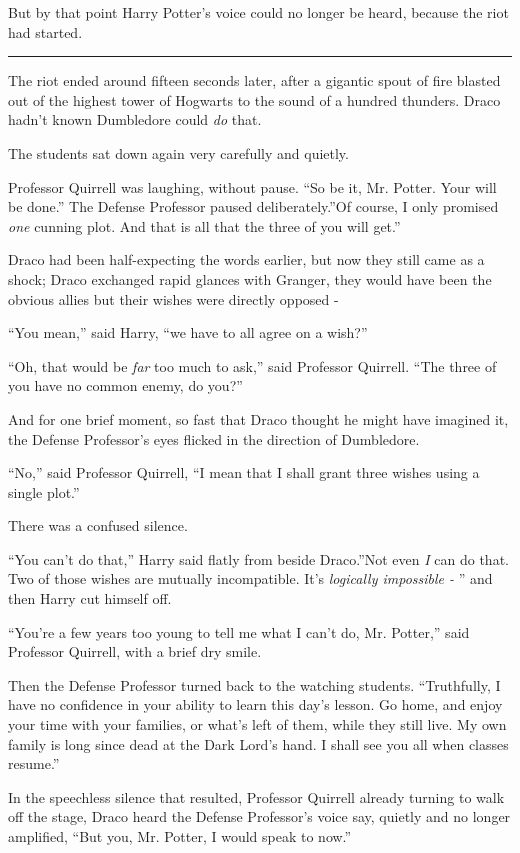 But by that point Harry Potter's voice could no longer be heard, because
the riot had started.

\begin{center}\rule{3in}{0.4pt}\end{center}

The riot ended around fifteen seconds later, after a gigantic spout of
fire blasted out of the highest tower of Hogwarts to the sound of a
hundred thunders. Draco hadn't known Dumbledore could \emph{do} that.

The students sat down again very carefully and quietly.

Professor Quirrell was laughing, without pause. ``So be it, Mr. Potter.
Your will be done.'' The Defense Professor paused deliberately.''Of
course, I only promised \emph{one} cunning plot. And that is all that
the three of you will get.''

Draco had been half-expecting the words earlier, but now they still came
as a shock; Draco exchanged rapid glances with Granger, they would have
been the obvious allies but their wishes were directly opposed -

``You mean,'' said Harry, ``we have to all agree on a wish?''

``Oh, that would be \emph{far} too much to ask,'' said Professor
Quirrell. ``The three of you have no common enemy, do you?''

And for one brief moment, so fast that Draco thought he might have
imagined it, the Defense Professor's eyes flicked in the direction of
Dumbledore.

``No,'' said Professor Quirrell, ``I mean that I shall grant three
wishes using a single plot.''

There was a confused silence.

``You can't do that,'' Harry said flatly from beside Draco.''Not even
\emph{I} can do that. Two of those wishes are mutually incompatible.
It's \emph{logically impossible -} '' and then Harry cut himself off.

``You're a few years too young to tell me what I can't do, Mr. Potter,''
said Professor Quirrell, with a brief dry smile.

Then the Defense Professor turned back to the watching students.
``Truthfully, I have no confidence in your ability to learn this day's
lesson. Go home, and enjoy your time with your families, or what's left
of them, while they still live. My own family is long since dead at the
Dark Lord's hand. I shall see you all when classes resume.''

In the speechless silence that resulted, Professor Quirrell already
turning to walk off the stage, Draco heard the Defense Professor's voice
say, quietly and no longer amplified, ``But you, Mr. Potter, I would
speak to now.''
